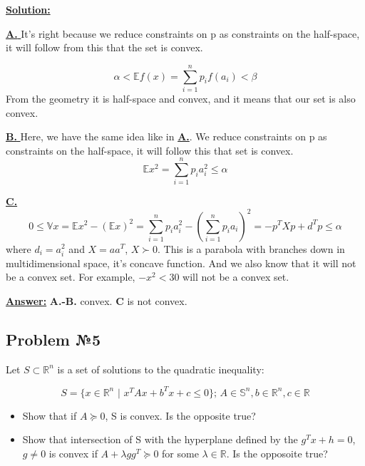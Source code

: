 \underline{\textbf{Solution:}}

\underline{\textbf{A. }} It's right because we reduce constraints on p as constraints on the half-space, it will follow from this that the set is convex.

\begin{equation*}
    \alpha < \mathds{E} f(x) = \sum\limits_{i=1}^n p_if(a_i) < \beta
\end{equation*}
From the geometry it is half-space and convex, and it means that our set is also convex.


\underline{\textbf{B. }}
Here, we have the same idea like in \underline{\textbf{A.}}. We reduce constraints on p as constraints on the half-space, it will follow this that set is convex.
\begin{equation*}
\mathds{E} x^2 = \sum\limits_{i = 1}^n p_i a_i^2 \leq \alpha
\end{equation*}

\underline{\textbf{C.}}
\begin{equation*}
    0 \leq \mathds{V}x = \mathds{E}x^2 - (\mathds{E} x)^2 = \sum\limits_{i = 1}^n p_i a_i^2 - \left( \sum\limits_{i = 1}^n p_ia_i \right)^2 = -p^TXp + d^Tp \leq \alpha
\end{equation*}
where $d_i = a_i^2$ and $X = aa^T$, $X \succ 0$. This is a parabola with branches down in multidimensional space, it's concave function. And we also know that it will not be a convex set. For example, $-x^2 < 30$ will not be a convex set.

\underline{\textbf{Answer:}}
\textbf{A.-B.} convex. \textbf{C} is not convex.

\subsection{Problem №5}
Let $S \subset \mathds{R}^n$ is a set of solutions to the quadratic inequality:

\begin{equation*}
    S = \{x \in \mathds{R}^n \text{ | } x^TAx + b^Tx + c \leq 0 \}\text{; } A \in \mathds{S}^n, b \in \mathds{R}^n, c \in \mathds{R}
\end{equation*}
\begin{itemize}
    \item Show that if $A \succcurlyeq 0$, S is convex. Is the opposite true?
    \item Show that intersection of S with the hyperplane defined by the $g^Tx + h = 0$, $g \not = 0$ is convex if $A + \lambda gg^T \succcurlyeq 0$ for some $\lambda \in \mathds{R}$. Is the opposoite true?
\end{itemize}

